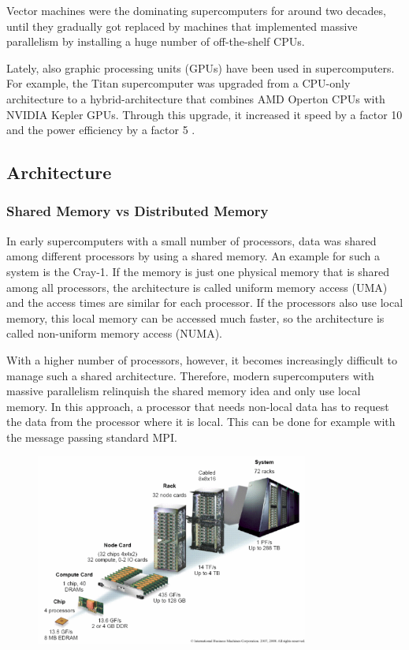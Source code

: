Vector machines were the dominating supercomputers for around two decades, until they gradually got replaced by machines that implemented massive parallelism by installing a huge number of off-the-shelf CPUs. 

Lately, also graphic processing units (GPUs) have been used in supercomputers. For example, the Titan supercomputer was upgraded from a CPU-only architecture to a hybrid-architecture that combines AMD Operton CPUs with NVIDIA Kepler GPUs. Through this upgrade, it increased it speed by a factor 10 and the power efficiency by a factor 5 \cite{titan}.


\subsection{Architecture}

\subsubsection{Shared Memory vs Distributed Memory}

In early supercomputers with a small number of processors, data was shared among different processors by using a shared memory. An example for such a system is the Cray-1. If the memory is just one physical memory that is shared among all processors, the architecture is called uniform memory access (UMA) and the access times are similar for each processor. If the processors also use local memory, this local memory can be accessed much faster, so the architecture is called non-uniform memory access (NUMA). 

With a higher number of processors, however, it becomes increasingly difficult to manage such a shared architecture. Therefore, modern supercomputers with massive parallelism relinquish the shared memory idea and only use local memory. In this approach, a processor that needs non-local data has to request the data from the processor where it is local. This can be done for example with the message passing standard MPI. 

\begin{figure}[h]
	\centering
	\includegraphics[width=0.8\textwidth]{architecture.png}
	\caption{} 
	\label{fig:finite_differences}
\end{figure}

